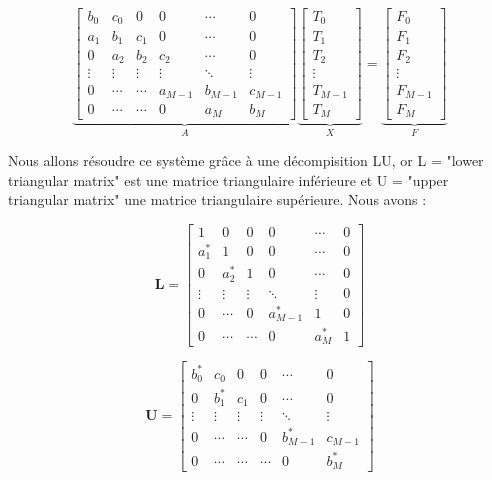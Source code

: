 \documentclass[12pt,a4paper]{article}
\begin{document}
	\[
	\underbrace{
	\begin{bmatrix}
		b_{0} & c_{0} & 0 & 0 & \cdots & 0 \\
		a_{1} & b_{1} & c_{1} & 0 & \cdots & 0 \\
		0 & a_{2} & b_{2} & c_{2} & \cdots & 0 \\
		\vdots & \vdots & \vdots & \vdots & \ddots & \vdots \\
		0 & \cdots & \cdots & a_{M-1} & b_{M-1} & c_{M-1} \\
		0 & \cdots & \cdots & 0 & a_{M} & b_{M}
	\end{bmatrix}
	}_{\text{$A$}}
	\underbrace{
	\begin{bmatrix}
		T_{0} \\
		T_{1} \\
		T_{2} \\
		\vdots \\
		T_{M-1} \\
		T_{M}
	\end{bmatrix}
	}_{\text{$X$}}
	=
	\underbrace{
	\begin{bmatrix}
		F_{0} \\
		F_{1} \\
		F_{2} \\
		\vdots \\
		F_{M-1} \\
		F_{M}
	\end{bmatrix}
	}_{\text{$F$}}
\]

Nous allons résoudre ce système grâce à une décompisition LU, or L = "lower triangular matrix" est une matrice triangulaire inférieure et U = "upper triangular matrix" une matrice triangulaire supérieure.
Nous avons :


\[
\mathbf{L} = \begin{bmatrix}
	1 & 0 & 0 & 0 & \cdots & 0 \\
	a^*_{1} & 1 & 0 & 0 & \cdots & 0 \\
	0 & a^*_{2} & 1 & 0 & \cdots & 0 \\
	\vdots & \vdots & \vdots & \ddots & \vdots & 0 \\
	0 & \cdots & 0 & a^*_{M-1} & 1 & 0 \\
	0 & \cdots & \cdots & 0 & a^*_{M} & 1
\end{bmatrix}
\]

\[
\mathbf{U} =\begin{bmatrix}
	b^*_{0} & c_0 & 0 & 0 & \cdots & 0\\
	0 & b^*_{1} & c_1 & 0 & \cdots & 0\\
	\vdots & \vdots & \vdots & \vdots & \ddots & \vdots \\
	0 & \cdots & \cdots & 0 & b^*_{M-1} & c_{M-1}\\
	0 & \cdots & \cdots & \cdots & 0 & b^*_{M}
\end{bmatrix}
\]
\end{document}
